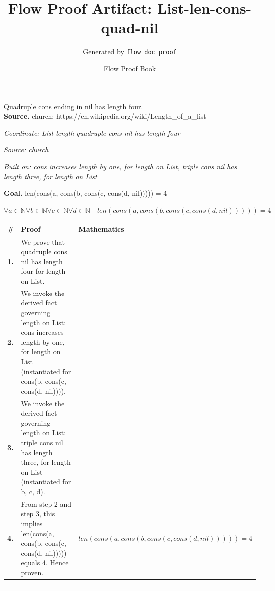 \documentclass[11pt]{article}
\title{Flow Proof Artifact: List-len-cons-quad-nil}
\author{Generated by \texttt{flow doc proof}}
\date{Flow Proof Book}
\theoremstyle{definition}
\begin{document}
\maketitle
Quadruple cons ending in nil has length four.\\[0.5em]
\textbf{Source.} church: https://en.wikipedia.org/wiki/Length\_of\_a\_list\\[0.5em]
\bigskip
{}\par
\smallskip\noindent\textit{Coordinate: List \cdot length \cdot quadruple cons nil has length four}\par
\smallskip\noindent\textit{Source: church}\par
\smallskip\noindent\textit{Built on: cons increases length by one, for length on List, triple cons nil has length three, for length on List}\par
\medskip
\noindent\textbf{Goal.} len(cons(a, cons(b, cons(c, cons(d, nil))))) = 4\par
\noindent$\displaystyle \forall a \in \mathbb{N} \forall b \in \mathbb{N} \forall c \in \mathbb{N} \forall d \in \mathbb{N}\quad len(cons(a, cons(b, cons(c, cons(d, nil))))) = 4$\par
\medskip
\noindent
\begin{tabular}{@{} >{\raggedright\arraybackslash}p{} >{\raggedright\arraybackslash}p{} >{\raggedleft\arraybackslash}p{} @{}}
\textbf{\#} & \textbf{Proof} & \textbf{Mathematics} \\
\midrule
\textbf{1.} & We prove that quadruple cons nil has length four for length on List. & \\[0.45em]
\textbf{2.} & We invoke the derived fact governing length on List: cons increases length by one, for length on List (instantiated for cons(b, cons(c, cons(d, nil)))). & \\[0.45em]
\textbf{3.} & We invoke the derived fact governing length on List: triple cons nil has length three, for length on List (instantiated for b, c, d). & \\[0.45em]
\textbf{4.} & From step 2 and step 3, this implies len(cons(a, cons(b, cons(c, cons(d, nil))))) equals 4. Hence proven. & $\displaystyle len(cons(a, cons(b, cons(c, cons(d, nil))))) = 4$ \\[0.45em]
\bottomrule
\end{tabular}
\label{thm:List-length-quadruple_cons_nil_has_length_four}
\par\medskip\hrule
\end{document}
